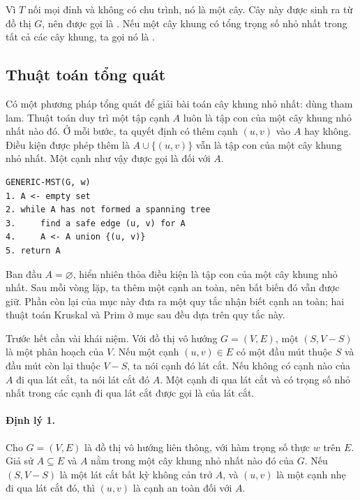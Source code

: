 \documentclass[11pt]{article}
\begin{document}
Vì $T$ nối mọi đỉnh và không có chu trình, nó là một cây. Cây này được sinh ra
từ đồ thị $G$, nên được gọi là . Nếu một cây khung có tổng
trọng số nhỏ nhất trong tất cả các cây khung, ta gọi nó là .

\subsection{Thuật toán tổng quát}

Có một phương pháp tổng quát để giải bài toán cây khung nhỏ nhất: dùng tham
lam. Thuật toán duy trì một tập cạnh $A$ luôn là tập con của một cây khung nhỏ
nhất nào đó. Ở mỗi bước, ta quyết định có thêm cạnh $(u,v)$ vào $A$ hay không.
Điều kiện được phép thêm là $A\cup\{(u,v)\}$ vẫn là tập con của một cây khung
nhỏ nhất. Một cạnh như vậy được gọi là  đối với $A$.

\begin{verbatim}
GENERIC-MST(G, w)
1. A <- empty set
2. while A has not formed a spanning tree
3.     find a safe edge (u, v) for A
4.     A <- A union {(u, v)}
5. return A
\end{verbatim}

Ban đầu $A=\varnothing$, hiển nhiên thỏa điều kiện là tập con của một cây khung
nhỏ nhất. Sau mỗi vòng lặp, ta thêm một cạnh an toàn, nên bất biến đó vẫn được
giữ. Phần còn lại của mục này đưa ra một quy tắc nhận biết cạnh an toàn; hai
thuật toán Kruskal và Prim ở mục sau đều dựa trên quy tắc này.

Trước hết cần vài khái niệm. Với đồ thị vô hướng $G=(V,E)$, một 
$(S,V-S)$ là một phân hoạch của $V$. Nếu một cạnh $(u,v)\in E$ có một đầu mút
thuộc $S$ và đầu mút còn lại thuộc $V-S$, ta nói cạnh đó  lát cắt.
Nếu không có cạnh nào của $A$ đi qua lát cắt, ta nói lát cắt đó  $A$. Một cạnh đi qua lát cắt và có trọng số nhỏ nhất trong các cạnh
đi qua lát cắt được gọi là  của lát cắt.

\paragraph{Định lý 1.}
Cho $G=(V,E)$ là đồ thị vô hướng liên thông, với hàm trọng số thực $w$ trên
$E$. Giả sử $A\subseteq E$ và $A$ nằm trong một cây khung nhỏ nhất nào đó của
$G$. Nếu $(S,V-S)$ là một lát cắt bất kỳ không cản trở $A$, và $(u,v)$ là một
cạnh nhẹ đi qua lát cắt đó, thì $(u,v)$ là cạnh an toàn đối với $A$.
\end{document}
